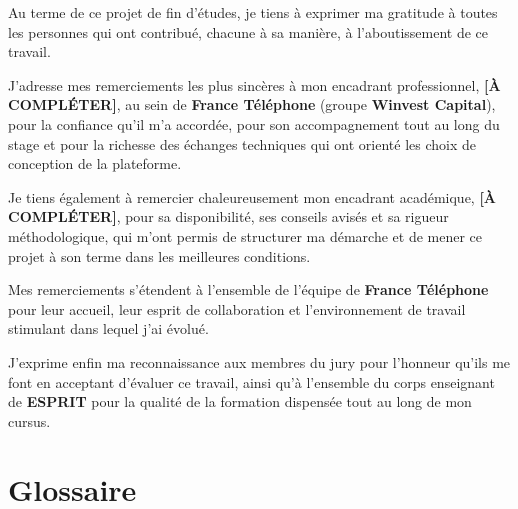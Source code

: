 \documentclass[12pt,a4paper,oneside]{report}
\begin{document}
Au terme de ce projet de fin d'études, je tiens à exprimer ma gratitude
à toutes les personnes qui ont contribué, chacune à sa manière, à
l'aboutissement de ce travail.

J'adresse mes remerciements les plus sincères à mon encadrant
professionnel, \textbf{[À COMPLÉTER]}, au sein de \textbf{France Téléphone}
(groupe \textbf{Winvest Capital}), pour la confiance qu'il m'a accordée,
pour son accompagnement tout au long du stage et pour la richesse des
échanges techniques qui ont orienté les choix de conception de la
plateforme.

Je tiens également à remercier chaleureusement mon encadrant académique,
\textbf{[À COMPLÉTER]}, pour sa disponibilité, ses conseils avisés et sa
rigueur méthodologique, qui m'ont permis de structurer ma démarche et de
mener ce projet à son terme dans les meilleures conditions.

Mes remerciements s'étendent à l'ensemble de l'équipe de
\textbf{France Téléphone} pour leur accueil, leur esprit de collaboration
et l'environnement de travail stimulant dans lequel j'ai évolué.

J'exprime enfin ma reconnaissance aux membres du jury pour l'honneur qu'ils
me font en acceptant d'évaluer ce travail, ainsi qu'à l'ensemble du corps
enseignant de \textbf{ESPRIT} pour la qualité de la formation dispensée
tout au long de mon cursus.

\tableofcontents
\listoffigures
\listoftables

\chapter*{Glossaire}
\end{document}
